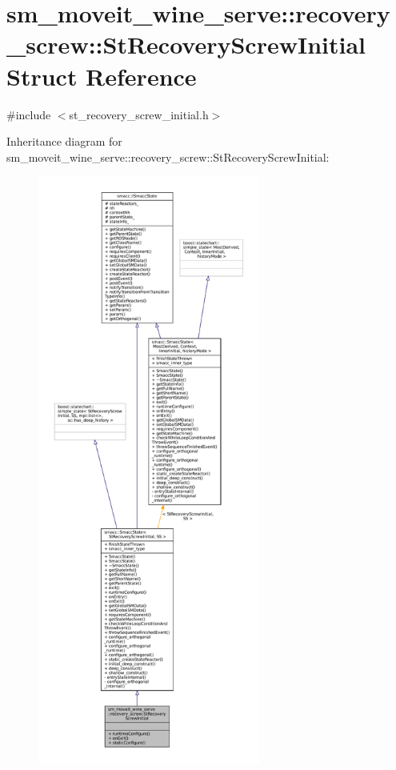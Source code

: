 \hypertarget{structsm__moveit__wine__serve_1_1recovery__screw_1_1StRecoveryScrewInitial}{}\section{sm\+\_\+moveit\+\_\+wine\+\_\+serve\+:\+:recovery\+\_\+screw\+:\+:St\+Recovery\+Screw\+Initial Struct Reference}
\label{structsm__moveit__wine__serve_1_1recovery__screw_1_1StRecoveryScrewInitial}


{\ttfamily \#include $<$st\+\_\+recovery\+\_\+screw\+\_\+initial.\+h$>$}



Inheritance diagram for sm\+\_\+moveit\+\_\+wine\+\_\+serve\+:\+:recovery\+\_\+screw\+:\+:St\+Recovery\+Screw\+Initial\+:
\nopagebreak
\begin{figure}[H]
\begin{center}
\leavevmode
\includegraphics[height=550pt]{structsm__moveit__wine__serve_1_1recovery__screw_1_1StRecoveryScrewInitial__inherit__graph}
\end{center}
\end{figure}


